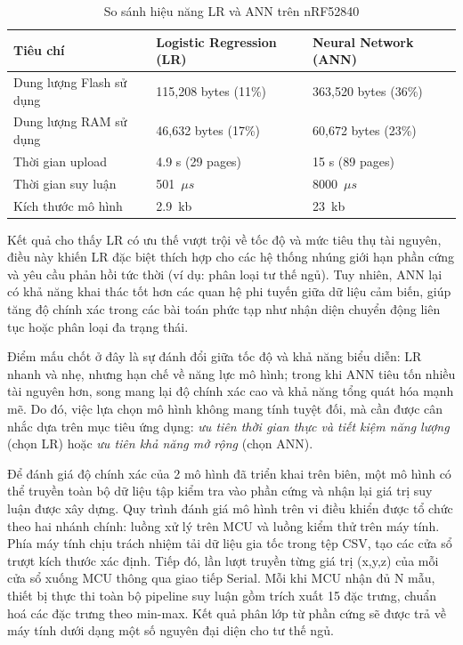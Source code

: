 \begin{table}[H]
    \centering
    \caption{So sánh hiệu năng LR và ANN trên nRF52840}
    \label{tab:comparison_full}
    \begin{tabular}{|l|p{5cm}|p{6cm}|}
        \hline
        \textbf{Tiêu chí}        & \textbf{Logistic Regression (LR)} & \textbf{Neural Network (ANN)} \\ \hline
        Dung lượng Flash sử dụng & 115,208 bytes (11\%)              & 363,520 bytes (36\%)          \\ \hline
        Dung lượng RAM sử dụng   & 46,632 bytes (17\%)               & 60,672 bytes (23\%)           \\ \hline
        Thời gian upload         & 4.9 s (29 pages)                  & 15 s (89 pages)               \\ \hline
        Thời gian suy luận       & 501~$\mu s$                       & 8000~$\mu s$                  \\ \hline
        Kích thước mô hình       & 2.9~kb                            & 23~kb                         \\ \hline

    \end{tabular}
\end{table}

Kết quả cho thấy LR có ưu thế vượt trội về tốc độ và mức tiêu thụ tài nguyên,
điều này khiến LR đặc biệt thích hợp cho các hệ thống nhúng giới hạn phần cứng
và yêu cầu phản hồi tức thời (ví dụ: phân loại tư thế ngủ). Tuy nhiên, ANN lại
có khả năng khai thác tốt hơn các quan hệ phi tuyến giữa dữ liệu cảm biến, giúp
tăng độ chính xác trong các bài toán phức tạp như nhận diện chuyển động liên
tục hoặc phân loại đa trạng thái.

Điểm mấu chốt ở đây là sự đánh đổi giữa tốc độ và khả năng biểu diễn:
LR nhanh và nhẹ, nhưng hạn chế về năng lực mô hình;
trong khi ANN tiêu tốn nhiều tài nguyên hơn, song mang
lại độ chính xác cao và khả năng tổng quát hóa mạnh mẽ.
Do đó, việc lựa chọn mô hình không mang tính tuyệt đối,
mà cần được cân nhắc dựa trên mục tiêu ứng dụng:
\textit{ưu tiên thời gian thực và tiết kiệm năng lượng} (chọn LR) hoặc
\textit{ưu tiên khả năng mở rộng} (chọn ANN).

Để đánh giá độ chính xác của 2 mô hình đã triển khai trên biên, một mô
hình có thể truyền toàn bộ dữ liệu tập kiểm
tra vào phần cứng và nhận lại giá trị suy luận được xây dựng.
Quy trình đánh giá mô hình trên vi điều khiển được tổ chức theo hai nhánh
chính: luồng xử lý trên MCU và luồng kiểm thử trên máy tính. Phía máy tính chịu
trách nhiệm tải dữ liệu gia tốc trong tệp CSV, tạo các cửa sổ trượt kích thước xác định. Tiếp đó, lần lượt truyền từng giá trị
(x,y,z) của mỗi cửa sổ xuống MCU thông qua giao tiếp Serial. Mỗi khi MCU nhận đủ
N mẫu, thiết bị thực thi toàn bộ pipeline suy luận gồm trích xuất 15 đặc trưng,
chuẩn hoá các đặc trưng theo min-max. Kết quả phân lớp từ phần cứng sẽ được trả về máy tính dưới dạng một số
nguyên đại diện cho tư thế ngủ.

